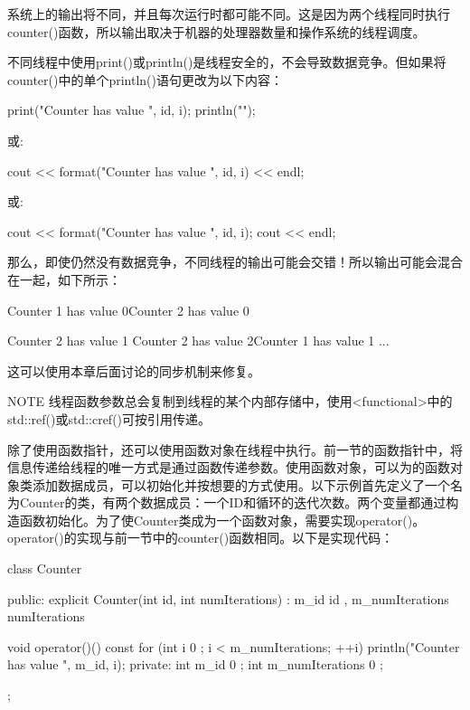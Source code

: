 系统上的输出将不同，并且每次运行时都可能不同。这是因为两个线程同时执行counter()函数，所以输出取决于机器的处理器数量和操作系统的线程调度。

不同线程中使用print()或println()是线程安全的，不会导致数据竞争。但如果将counter()中的单个println()语句更改为以下内容：

\begin{cpp}
print("Counter {} has value {}", id, i);
println("");
\end{cpp}

或:

\begin{cpp}
cout << format("Counter {} has value {}", id, i) << endl;
\end{cpp}

或:

\begin{cpp}
cout << format("Counter {} has value {}", id, i);
cout << endl;
\end{cpp}

那么，即使仍然没有数据竞争，不同线程的输出可能会交错！所以输出可能会混合在一起，如下所示：

\begin{shell}
Counter 1 has value 0Counter 2 has value 0

Counter 2 has value 1
Counter 2 has value 2Counter 1 has value 1
...
\end{shell}

这可以使用本章后面讨论的同步机制来修复。

\begin{myNotic}{NOTE}
线程函数参数总会复制到线程的某个内部存储中，使用<functional>中的std::ref()或std::cref()可按引用传递。
\end{myNotic}


除了使用函数指针，还可以使用函数对象在线程中执行。前一节的函数指针中，将信息传递给线程的唯一方式是通过函数传递参数。使用函数对象，可以为的函数对象类添加数据成员，可以初始化并按想要的方式使用。以下示例首先定义了一个名为Counter的类，有两个数据成员：一个ID和循环的迭代次数。两个变量都通过构造函数初始化。为了使Counter类成为一个函数对象，需要实现operator()。operator()的实现与前一节中的counter()函数相同。以下是实现代码：

\begin{cpp}
class Counter
{
    public:
        explicit Counter(int id, int numIterations)
            : m_id { id }, m_numIterations { numIterations } { }

        void operator()() const
        {
            for (int i { 0 }; i < m_numIterations; ++i) {
                println("Counter {} has value {}", m_id, i);
            }
        }
    private:
        int m_id { 0 };
        int m_numIterations { 0 };
};
\end{cpp}

